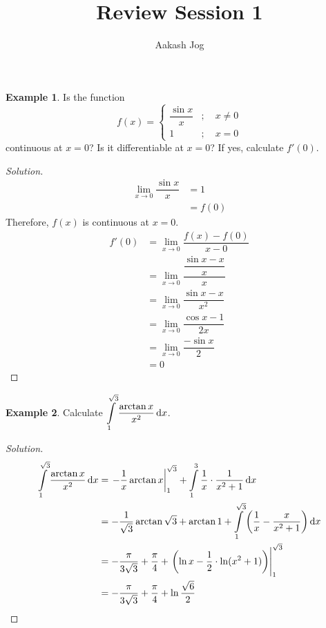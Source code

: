 \documentclass[fleqn, a4paper, 12pt]{article}
\title{Review Session 1}
\author{Aakash Jog}
\date{\formatdate{22}{1}{2015}}
\theoremstyle{definition}
\newtheorem{example}{Example}
\theoremstyle{theorem}
\theoremstyle{remark}
\newenvironment{solution}
{\begin{proof}[Solution]\let\qed\relax}
	{\end{proof}}
\begin{document}
	
\maketitle

\begin{example}
	Is the function 
	\begin{equation*}
		f(x) = 
			\begin{cases}
				\dfrac{\sin x}{x} &;\quad x \neq 0\\
				1 &;\quad x = 0
			\end{cases}
	\end{equation*}
	continuous at $x = 0$? Is it differentiable at $x = 0$? If yes, calculate $f'(0)$.
\end{example}

\begin{solution}
	\begin{align*}
		\lim\limits_{x \to 0} \dfrac{\sin x}{x} &= 1\\
		&= f(0)
	\end{align*}
	Therefore, $f(x)$ is continuous at $x = 0$.
	\begin{align*}
		f'(0) &= \lim\limits_{x \to 0} \dfrac{f(x) - f(0)}{x - 0}\\
		&= \lim\limits_{x \to 0} \dfrac{\dfrac{\sin x - x}{x}}{x}\\
		&= \lim\limits_{x \to 0} \dfrac{\sin x - x}{x^2}\\
		&= \lim\limits_{x \to 0} \dfrac{\cos x - 1}{2x}\\
		&= \lim\limits_{x \to 0} \dfrac{-\sin x}{2}\\
		&= 0
	\end{align*}
\end{solution}

\begin{example}
	Calculate $\displaystyle \int\limits_{1}^{\sqrt{3}} \dfrac{\arctan{x}}{x^2} \dif x$.
\end{example}

\begin{solution}
	\begin{align*}
		\int\limits_{1}^{\sqrt{3}} \dfrac{\arctan x}{x^2} \dif x &= \left. -\dfrac{1}{x} \arctan x \right|_{1}^{\sqrt{3}} + \int\limits_{1}^{3} \dfrac{1}{x} \cdot \dfrac{1}{x^2 + 1} \dif x\\
		&= -\dfrac{1}{\sqrt{3}} \arctan \sqrt{3} + \arctan 1 + \int\limits_{1}^{\sqrt{3}} \left( \dfrac{1}{x} - \dfrac{x}{x^2 + 1} \right) \dif x\\
		&= -\dfrac{\pi}{3 \sqrt{3}} + \dfrac{\pi}{4} + \left. \left( \ln x - \dfrac{1}{2} \cdot \ln(x^2 + 1) \right) \right|_{1}^{\sqrt{3}}\\
		&= -\dfrac{\pi}{3\sqrt{3}} + \dfrac{\pi}{4} + \ln \dfrac{\sqrt{6}}{2} 
	\end{align*}
\end{solution}
\end{document}
